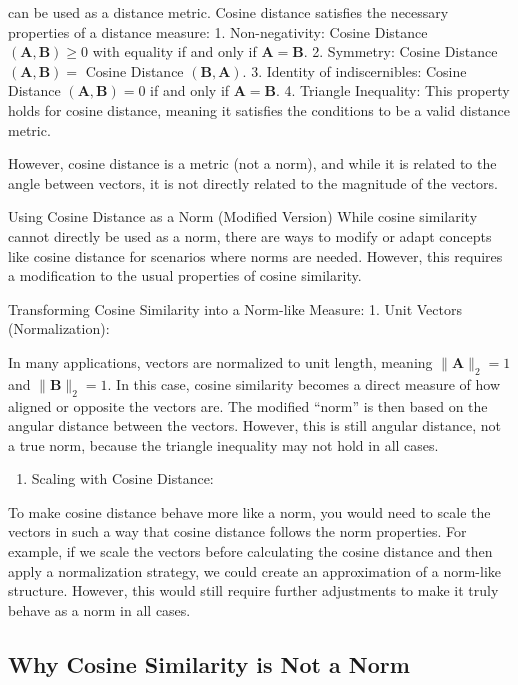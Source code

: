 \documentclass[
  12 pt,
  a4paper,
]{book}
\providecommand{\tightlist}{%
  \setlength{\itemsep}{0pt}\setlength{\parskip}{0pt}}
\numberwithin{equation}{section}
\theoremstyle{plain}      %
\theoremstyle{definition} %
\theoremstyle{remark}     %
\theoremstyle{note}         %
\begin{document}
can be used as a distance metric. Cosine distance satisfies the
necessary properties of a distance measure: 1. Non-negativity: Cosine
Distance \((\mathbf{A}, \mathbf{B}) \geq 0\) with equality if and only
if \(\mathbf{A}=\mathbf{B}\). 2. Symmetry: Cosine Distance
\((\mathbf{A}, \mathbf{B})=\) Cosine Distance
\((\mathbf{B}, \mathbf{A})\). 3. Identity of indiscernibles: Cosine
Distance \((\mathbf{A}, \mathbf{B})=0\) if and only if
\(\mathbf{A}=\mathbf{B}\). 4. Triangle Inequality: This property holds
for cosine distance, meaning it satisfies the conditions to be a valid
distance metric.

However, cosine distance is a metric (not a norm), and while it is
related to the angle between vectors, it is not directly related to the
magnitude of the vectors.

Using Cosine Distance as a Norm (Modified Version) While cosine
similarity cannot directly be used as a norm, there are ways to modify
or adapt concepts like cosine distance for scenarios where norms are
needed. However, this requires a modification to the usual properties of
cosine similarity.

Transforming Cosine Similarity into a Norm-like Measure: 1. Unit Vectors
(Normalization):

In many applications, vectors are normalized to unit length, meaning
\(\|\mathbf{A}\|_2=1\) and \(\|\mathbf{B}\|_2=1\). In this case, cosine
similarity becomes a direct measure of how aligned or opposite the
vectors are. The modified ``norm'' is then based on the angular distance
between the vectors. However, this is still angular distance, not a true
norm, because the triangle inequality may not hold in all cases.

\begin{enumerate}
\def\labelenumi{\arabic{enumi}.}
\setcounter{enumi}{1}
\tightlist
\item
  Scaling with Cosine Distance:
\end{enumerate}

To make cosine distance behave more like a norm, you would need to scale
the vectors in such a way that cosine distance follows the norm
properties. For example, if we scale the vectors before calculating the
cosine distance and then apply a normalization strategy, we could create
an approximation of a norm-like structure. However, this would still
require further adjustments to make it truly behave as a norm in all
cases.

\hypertarget{why-cosine-similarity-is-not-a-norm}{%
\subsection{Why Cosine Similarity is Not a
Norm}\label{why-cosine-similarity-is-not-a-norm}}
\end{document}

